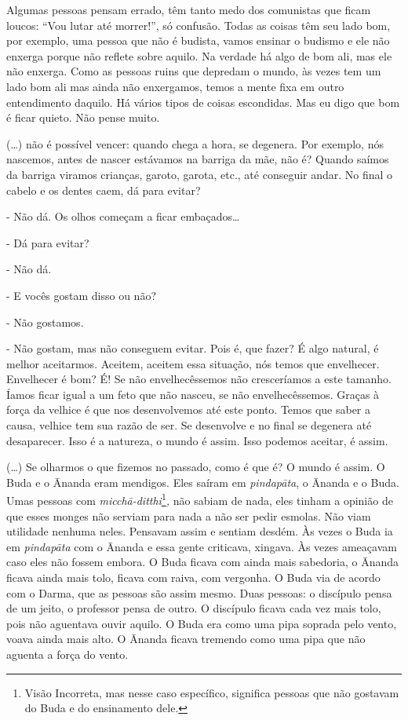 Algumas pessoas pensam errado, têm tanto medo dos comunistas que
ficam loucos: “Vou lutar até morrer!”, só confusão. Todas as coisas têm
seu lado bom, por exemplo, uma pessoa que não é budista, vamos ensinar
o budismo e ele não enxerga porque não reflete sobre aquilo. Na verdade
há algo de bom ali, mas ele não enxerga. Como as pessoas ruins que
depredam o mundo, às vezes tem um lado bom ali mas ainda não
enxergamos, temos a mente fixa em outro entendimento daquilo. Há vários
tipos de coisas escondidas. Mas eu digo que bom é ficar quieto. Não
pense muito.

(…) não é possível vencer: quando chega a hora, se degenera. Por
exemplo, nós nascemos, antes de nascer estávamos na barriga da mãe, não
é? Quando saímos da barriga viramos crianças, garoto, garota, etc., até
conseguir andar. No final o cabelo e os dentes caem, dá para evitar?

{}- Não dá. Os olhos começam a ficar embaçados…

{}- Dá para evitar?

{}- Não dá.

{}- E vocês gostam disso ou não?

{}- Não gostamos.

{}- Não gostam, mas não conseguem evitar. Pois é, que fazer? É algo
natural, é melhor aceitarmos. Aceitem, aceitem essa situação, nós temos
que envelhecer. Envelhecer é bom? É! Se não envelhecêssemos não
cresceríamos a este tamanho. Íamos ficar igual a um feto que não
nasceu, se não envelhecêssemos. Graças à força da velhice é que nos
desenvolvemos até este ponto. Temos que saber a causa, velhice tem sua
razão de ser. Se desenvolve e no final se degenera até desaparecer.
Isso é a natureza, o mundo é assim. Isso podemos aceitar, é assim.

(…) Se olharmos o que fizemos no passado, como é que é? O mundo é
assim. O Buda e o \=Ananda eram mendigos. Eles saíram em
\textit{pindap\=ata}, o \=Ananda e o Buda. Umas pessoas com
\textit{micch\=a-ditthi}\footnote{Visão Incorreta, mas nesse caso
específico, significa pessoas que não gostavam do Buda e do ensinamento
dele.}\textit{,} não sabiam de nada, eles tinham a opinião de que esses
monges não serviam para nada a não ser pedir esmolas. Não viam
utilidade nenhuma neles. Pensavam assim e sentiam desdém. Às vezes o
Buda ia em \textit{pindap\=ata }com o \=Ananda e essa gente criticava,
xingava. Às vezes ameaçavam caso eles não fossem embora. O Buda ficava
com ainda mais sabedoria, o \=Ananda ficava ainda mais tolo, ficava com
raiva, com vergonha. O Buda via de acordo com o Darma, que as pessoas
são assim mesmo. Duas pessoas: o discípulo pensa de um jeito, o
professor pensa de outro. O discípulo ficava cada vez mais tolo, pois
não aguentava ouvir aquilo. O Buda era como uma pipa soprada pelo
vento, voava ainda mais alto. O \=Ananda ficava tremendo como uma pipa
que não aguenta a força do vento.

